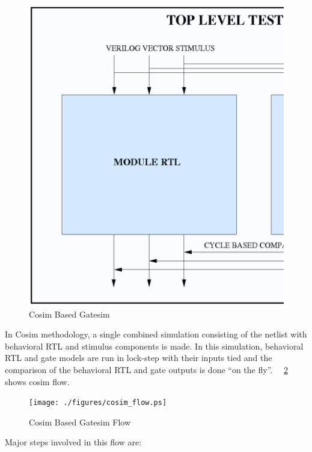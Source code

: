 \begin{figure}[h!]
\centering
\includegraphics[scale=0.35]{./figures/cosim.ps}
\caption{Cosim Based Gatesim}
\label{fig:cosim.ps}
\end{figure}


 In Cosim methodology, a single combined simulation consisting of the netlist with behavioral RTL and stimulus components is made. In this simulation, behavioral RTL and gate models are run in lock-step with their inputs tied and the comparison of the behavioral RTL and gate outputs is done ``on the fly''. ~\figurename{~\ref{fig:cosim_flow.ps}} shows cosim flow.




\begin{figure}[h]
\centering
\texttt{[image: ./figures/cosim\_flow.ps]}
\caption{Cosim Based Gatesim Flow}
\label{fig:cosim_flow.ps}
\end{figure}

Major steps involved in this flow are:

